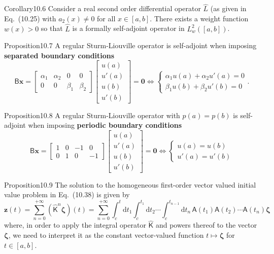 \begin{res}{Corollary}{10.6}
Consider a real second order differential operator $\hat L$ (as given in Eq.~(10.25) with $a_2(x)\ne0$ for all $x\in[a,b]$. There exists a weight function $w(x)>0$ so that $\hat L$ is a formally self-adjoint operator in $L^2_w([a,b])$.
\end{res}

\begin{res}{Proposition}{10.7}
A regular Sturm-Liouville operator is self-adjoint when imposing \textbf{separated boundary conditions}
\begin{equation}\mathsf B\boldsymbol x=\begin{bmatrix}\alpha_1&\alpha_2&0&0\\0&0&\beta_1&\beta_2\end{bmatrix}\begin{bmatrix}u(a)\\u'(a)\\u(b)\\u'(b)\end{bmatrix}=\boldsymbol 0\iff\begin{cases}\alpha_1u(a)+\alpha_2u'(a)=0\\\beta_1u(b)+\beta_2u'(b)=0\end{cases}.\tag{10.34}\end{equation}
\end{res}

\begin{res}{Proposition}{10.8}
A regular Sturm-Liouville operator with $p(a)=p(b)$ is self-adjoint when imposing \textbf{periodic boundary conditions}
\begin{equation}\mathsf B\boldsymbol x=\begin{bmatrix}1&0&-1&0\\0&1&0&-1\end{bmatrix}\begin{bmatrix}u(a)\\u'(a)\\u(b)\\u'(b)\end{bmatrix}=\boldsymbol 0\iff\begin{cases}u(a)=u(b)\\u'(a)=u'(b)\end{cases}\tag{10.35}\end{equation}
\end{res}

\begin{res}{Proposition}{10.9}
The solution to the homogeneous first-order vector valued initial value problem in Eq.~(10.38) is given by
\begin{equation}\boldsymbol z(t)=\sum_{n=0}^{+\infty}(\hat{\mathsf K}^n\boldsymbol\zeta)(t)=\sum_{n=0}^{+\infty}\int_c^t\mathrm dt_1\int_c^{t_1}\mathrm dt_2\cdots\int_c^{t_{n-1}}\mathrm dt_n\,\mathsf A(t_1)\mathsf A(t_2)\cdots\mathsf A(t_n)\boldsymbol\zeta\tag{10.46}\end{equation}
where, in order to apply the integral operator $\hat{\mathsf K}$ and powers thereof to the vector $\boldsymbol\zeta$, we need to interpret it as the constant vector-valued function $t\mapsto\boldsymbol\zeta$ for $t\in[a,b]$.
\end{res}

